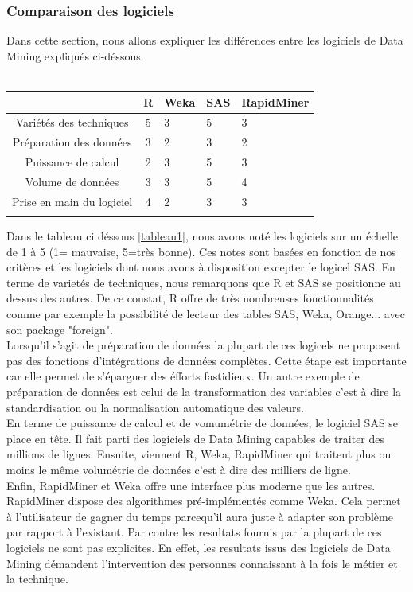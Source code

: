 \documentclass[11pt,a4paper]{report}
\begin{document}
\subsubsection{Comparaison des logiciels}
Dans cette  section, nous allons expliquer les différences entre les logiciels de Data Mining expliqués ci-déssous. \\\\
\begin{tabular}{|c|c|l|l|l|} 
\hline  
    &R & Weka& SAS & RapidMiner \\  
\hline 
Variétés des techniques & 5 & 3 & 5 & 3 \\  
\hline 
Préparation des données & 3 & 2 & 3 & 2 \\
\hline 
Puissance de calcul& 2 & 3 & 5 & 3\\ 
\hline 
Volume de données& 3 & 3 & 5 & 4\\
\hline 
Prise en main du logiciel & 4 & 2 & 3 & 3 \\ 
\hline 
\label{tableau1}
\end{tabular}

Dans le tableau ci déssous \ref{tableau1}, nous avons noté les logiciels sur un échelle de 1 à 5 (1= mauvaise, 5=très bonne). Ces notes sont basées en fonction de nos critères et les logiciels dont nous avons à disposition excepter le logicel SAS. En terme de varietés de techniques, nous remarquons que R et SAS se positionne au dessus des autres. De ce constat, R  offre de très nombreuses fonctionnalités comme par exemple la possibilité de lecteur des tables SAS, Weka, Orange... avec son package "foreign".\\
Lorsqu'il s'agit de préparation de données la plupart de ces logicels ne proposent pas des fonctions d'intégrations de données complètes. Cette étape est importante car elle permet de s'épargner des éfforts fastidieux. Un autre exemple de préparation de données est celui de la transformation des variables c'est à dire la standardisation ou la normalisation automatique des valeurs. \\
En terme de puissance de calcul et de vomumétrie de données, le logiciel SAS se place en tête. Il fait parti des logiciels de Data Mining capables de traiter des millions de lignes. Ensuite, viennent R, Weka, RapidMiner qui traitent plus ou moins le même volumétrie de données c'est à dire des milliers de ligne. \\

Enfin, RapidMiner et Weka offre une interface plus moderne que les autres. RapidMiner dispose des algorithmes pré-implémentés comme Weka. Cela permet à l'utilisateur de gagner du temps parcequ'il aura juste à adapter son problème par rapport à l'existant. Par contre les resultats fournis par la plupart  de ces logiciels ne sont pas explicites. En effet, les resultats issus des logiciels de Data Mining démandent l'intervention des personnes connaissant à la fois le métier et la technique. 
 
\end{document}
